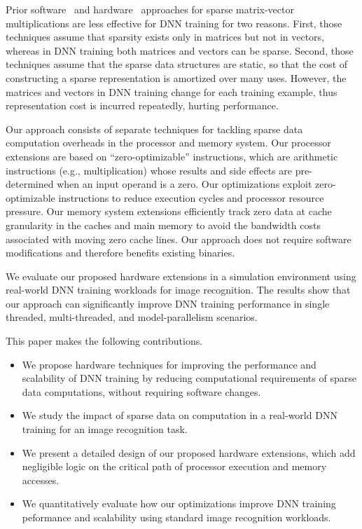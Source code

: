 Prior software~\cite{Eisenstat82, IntelSparseMatrix} and hardware~\cite{Carter99, Srinidhi12, Fowers13} approaches for sparse matrix-vector multiplications are less effective for DNN training for two reasons.  First, those techniques assume that sparsity exists only in matrices but not in vectors, whereas in DNN training both matrices and vectors can be sparse.  Second, those techniques assume that the sparse data structures are static, so that the cost of constructing a sparse representation is amortized over many uses.  However, the matrices and vectors in DNN training change for each training example, thus representation cost is incurred repeatedly, hurting performance. 

Our approach consists of separate techniques for tackling sparse data computation overheads in the processor and memory system.  Our processor extensions are based on ``zero-optimizable'' instructions, which are arithmetic instructions (e.g., multiplication) whose results and side effects are pre-determined when an input operand is a zero. Our optimizations exploit zero-optimizable instructions to reduce execution cycles and processor resource pressure.  Our memory system extensions efficiently track zero data at cache granularity in the caches and main memory to avoid the bandwidth costs associated with moving zero cache lines. Our approach does not require software modifications and therefore benefits existing binaries.

We evaluate our proposed hardware extensions in a simulation environment using real-world DNN training workloads for image recognition. The results show that our approach can significantly improve DNN training performance in single threaded, multi-threaded, and model-parallelism scenarios.

This paper makes the following contributions.
\begin{itemize}

\item We propose hardware techniques for improving the performance and scalability of DNN training by reducing computational requirements of sparse data computations, without requiring software changes. 
\item We study the impact of sparse data on computation in a real-world DNN training for an image recognition task. 
\item We present a detailed design of our proposed hardware extensions, which add negligible logic on the critical path of processor execution and memory accesses. 
\item We quantitatively evaluate how our optimizations improve DNN training peformance and scalability using standard image recognition workloads. 

\end{itemize}


